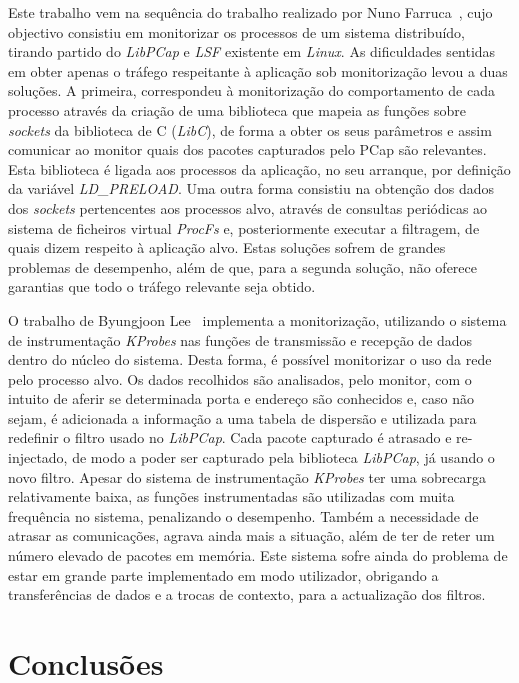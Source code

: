 \documentclass[a4paper]{llncs}
\begin{document}
Este trabalho vem na sequência do trabalho realizado por Nuno Farruca~\cite{duarte10,Farruca:2009}, cujo objectivo consistiu em monitorizar os processos de um sistema distribuído, tirando partido do \textit{LibPCap} e \textit{LSF} existente em \textit{Linux}.
 As dificuldades sentidas em obter apenas o tráfego respeitante à aplicação sob monitorização levou a duas soluções.
 A primeira, correspondeu à monitorização do comportamento de cada processo através da criação de uma biblioteca que mapeia as funções sobre \textit{sockets} da biblioteca de C (\textit{LibC}), de forma a obter os seus parâmetros e assim comunicar ao monitor quais dos pacotes capturados pelo PCap são relevantes.
 Esta biblioteca é ligada aos processos da aplicação, no seu arranque, por definição da variável \textit{LD\_PRELOAD}.
 Uma outra forma consistiu na obtenção dos dados dos \textit{sockets} pertencentes aos processos alvo, através de consultas periódicas ao sistema de ficheiros virtual \textit{ProcFs} e, posteriormente executar a filtragem, de quais dizem respeito à aplicação alvo.
 Estas soluções sofrem de grandes problemas de desempenho, além de que, para a segunda solução, não oferece garantias que todo o tráfego relevante seja obtido.

O trabalho de Byungjoon Lee~\cite{1688981} implementa a monitorização, utilizando o sistema de instrumentação \textit{KProbes} nas funções de transmissão e recepção de dados dentro do núcleo do sistema.
 Desta forma, é possível monitorizar o uso da rede pelo processo alvo.
 Os dados recolhidos são analisados, pelo monitor, com o intuito de aferir se determinada porta e endereço são conhecidos e, caso não sejam, é adicionada a informação a uma tabela de dispersão e utilizada para redefinir o filtro usado no \textit{LibPCap}.
 Cada pacote capturado é atrasado e re-injectado, de modo a poder ser capturado pela biblioteca \textit{LibPCap}, já usando o novo filtro.
 Apesar do sistema de instrumentação \textit{KProbes} ter uma sobrecarga relativamente baixa, as funções instrumentadas são utilizadas com muita frequência no sistema, penalizando o desempenho.
 Também a necessidade de atrasar as comunicações, agrava ainda mais a situação, além de ter de reter um número elevado de pacotes em memória.
 Este sistema sofre ainda do problema de estar em grande parte implementado em modo utilizador, obrigando a transferências de dados e a trocas de contexto, para a actualização dos filtros.

\section{Conclusões}
\label{sec:conclusions}
\end{document}
